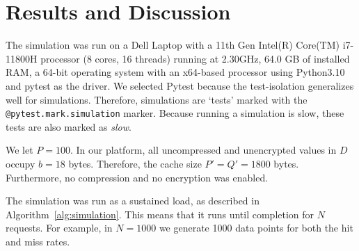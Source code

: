 
\section{Results and Discussion}
The simulation was run
on a Dell Laptop with a 11th Gen Intel(R) Core(TM) i7-11800H processor (8 cores, 16 threads)
running at 2.30GHz, 64.0 GB of installed RAM,
a 64-bit operating system with an x64-based processor
using Python3.10 and pytest as the driver.
We selected Pytest because the test-isolation generalizes
well for simulations. Therefore, simulations
are `tests' marked with the \texttt{@pytest.mark.simulation}
marker. Because running a simulation is slow,
these tests are also marked as \textit{slow}.

We let $P = 100$.
In our platform, all uncompressed and unencrypted
values in $D$ occupy $b = 18$ bytes.
Therefore, the cache size $P' = Q' = 1800$ bytes.
Furthermore, no compression and no encryption
was enabled.

The simulation was run as a sustained load,
as described in Algorithm~\ref{alg:simulation}.
This means that it runs until completion
for
$N$ requests. For example, in $N=1000$
we generate 1000 data points for both
the hit and miss rates.